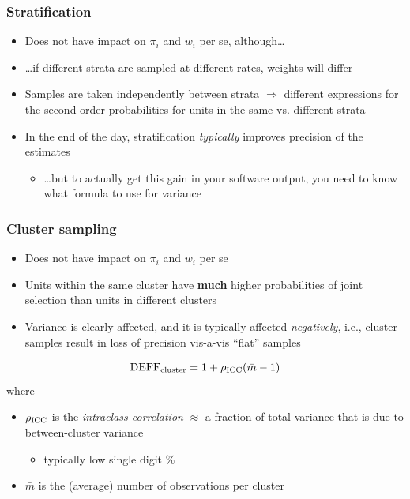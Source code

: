 \documentclass{beamer}
\begin{document}
\begin{frame}\frametitle{Stratification}

\begin{itemize}
    \item Does not have impact on $\pi_i$ and $w_i$ per se, although\ldots
    \item \ldots if different strata are sampled at different rates, weights will differ
    \item Samples are taken independently between strata $\Rightarrow$ different
        expressions for the second order probabilities for units in the same vs. different strata
    \item In the end of the day, stratification \textit{typically} improves precision of the estimates
        \begin{itemize}
            \item \ldots but to actually get this gain in your software output,
                you need to know what formula to use for variance
        \end{itemize}
\end{itemize}

\end{frame}

\begin{frame}\frametitle{Cluster sampling}

\begin{itemize}
    \item Does not have impact on $\pi_i$ and $w_i$ per se
    \item Units within the same cluster have \textbf{much} higher probabilities of joint selection
        than units in different clusters
    \item Variance is clearly affected, and it is typically affected \textit{negatively},
        i.e., cluster samples result in loss of precision vis-a-vis ``flat'' samples
\end{itemize}

\bigskip

$$
{\rm DEFF}_{\rm cluster} = 1 + \rho_{\rm ICC}(\bar m-1)
$$
where
\begin{itemize}
    \item $\rho_{\rm ICC}$ is the \textit{intraclass correlation} $\approx$
        a fraction of total variance that is due to between-cluster variance
        \begin{itemize} \item typically low single digit \% \end{itemize}
    \item $\bar m$ is the (average) number of observations per cluster
\end{itemize}

\end{frame}
\end{document}
